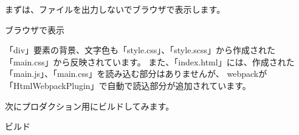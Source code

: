 まずは、ファイルを出力しないでブラウザで表示します。

\def\startercodeblockfontsize{}
\begin{starterterminal}[]{ブラウザで表示}\end{starterterminal}

「div」要素の背景、文字色も「style.css」、「style.scss」から作成された「main.css」から反映されています。
また、「index.html」には、作成された「main.js」、「main.css」を読み込む部分はありませんが、
webpackが「HtmlWebpackPlugin」で自動で読込部分が追加されています。

\begin{reviewimage}[H]%
%
\label{image:02-create-react-app:webpack_test04}
\end{reviewimage}

次にプロダクション用にビルドしてみます。

\def\startercodeblockfontsize{}
\begin{starterterminal}[]{ビルド}\end{starterterminal}

